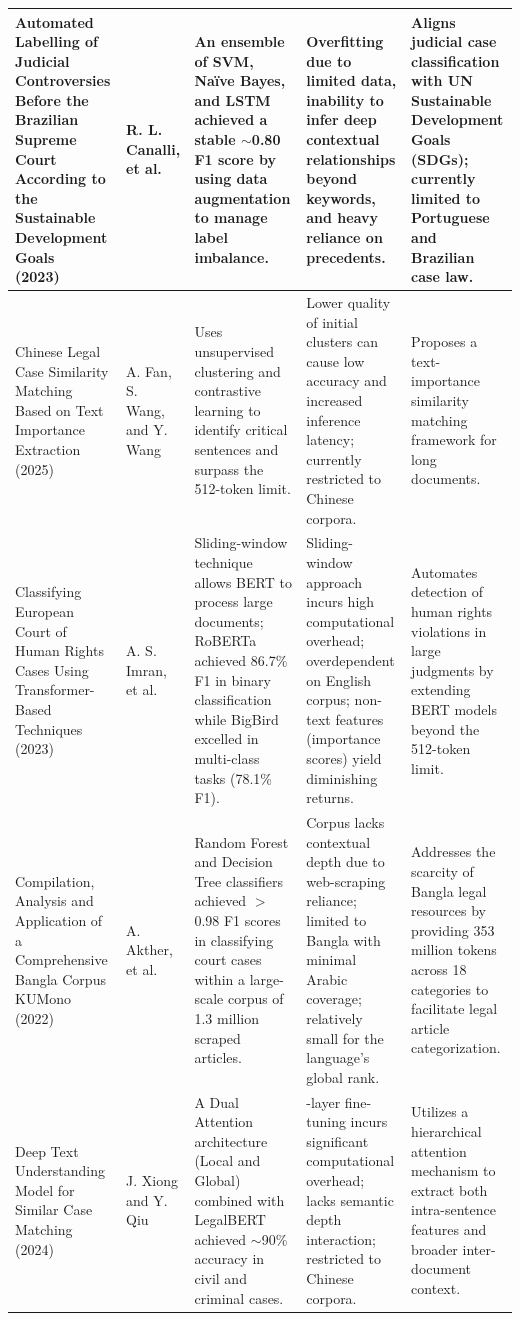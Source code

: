 {\begin{longtable}{|p{}|p{}|>{\raggedright\arraybackslash}p{}|>{\raggedright\arraybackslash}p{}|>{\raggedright\arraybackslash}p{}|}
Automated Labelling of Judicial Controversies Before the Brazilian Supreme Court According to the Sustainable Development Goals (2023)~\cite{b7} & 
R. L. Canalli, et al. & 
An ensemble of SVM, Naïve Bayes, and LSTM achieved a stable $\sim$0.80 F1 score by using data augmentation to manage label imbalance. & 
Overfitting due to limited data, inability to infer deep contextual relationships beyond keywords, and heavy reliance on precedents. & 
Aligns judicial case classification with UN Sustainable Development Goals (SDGs); currently limited to Portuguese and Brazilian case law. \\ \hline


Chinese Legal Case Similarity Matching Based on Text Importance Extraction (2025)~\cite{b8} & 
A. Fan, S. Wang, and Y. Wang & 
Uses unsupervised clustering and contrastive learning to identify critical sentences and surpass the 512-token limit. & 
Lower quality of initial clusters can cause low accuracy and increased inference latency; currently restricted to Chinese corpora. & 
Proposes a text-importance similarity matching framework for long documents. \\ \hline


Classifying European Court of Human Rights Cases Using Transformer-Based Techniques (2023)~\cite{b9} & 
A. S. Imran, et al. & 
Sliding-window technique allows BERT to process large documents; RoBERTa achieved 86.7\% F1 in binary classification while BigBird excelled in multi-class tasks (78.1\% F1). & 
Sliding-window approach incurs high computational overhead; overdependent on English corpus; non-text features (importance scores) yield diminishing returns. & 
Automates detection of human rights violations in large judgments by extending BERT models beyond the 512-token limit. \\ \hline


Compilation, Analysis and Application of a Comprehensive Bangla Corpus KUMono (2022)~\cite{b10} & 
A. Akther, et al. & 
Random Forest and Decision Tree classifiers achieved $>$0.98 F1 scores in classifying court cases within a large-scale corpus of 1.3 million scraped articles. & 
Corpus lacks contextual depth due to web-scraping reliance; limited to Bangla with minimal Arabic coverage; relatively small for the language's global rank. & 
Addresses the scarcity of Bangla legal resources by providing 353 million tokens across 18 categories to facilitate legal article categorization. \\ \hline


Deep Text Understanding Model for Similar Case Matching (2024)~\cite{b11} & 
J. Xiong and Y. Qiu & 
A Dual Attention architecture (Local and Global) combined with LegalBERT achieved $\sim$90\% accuracy in civil and criminal cases. & 
12-layer fine-tuning incurs significant computational overhead; lacks semantic depth interaction; restricted to Chinese corpora. & 
Utilizes a hierarchical attention mechanism to extract both intra-sentence features and broader inter-document context. \\ \hline



\end{longtable}}
